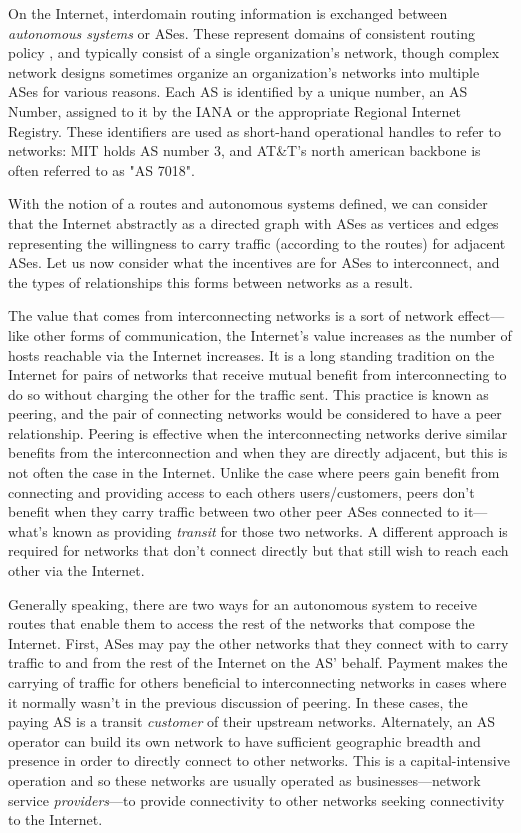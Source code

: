 On the Internet, interdomain routing information is exchanged between \emph{autonomous systems} or ASes. These represent domains of consistent routing policy \cite{rfc1930}, and typically consist of a single organization's network, though complex network designs sometimes organize an organization's networks into multiple ASes for various reasons. Each AS is identified by a unique number, an AS Number, assigned to it by the IANA or the appropriate Regional Internet Registry. These identifiers are used as short-hand operational handles to refer to networks: MIT holds AS number 3, and AT\&T's north american backbone is often referred to as "AS 7018".

With the notion of a routes and autonomous systems defined, we can consider that the Internet abstractly as a directed graph with ASes as vertices and edges representing the willingness to carry traffic (according to the routes) for adjacent ASes. Let us now consider what the incentives are for ASes to interconnect, and the types of relationships this forms between networks as a result.

The value that comes from interconnecting networks is a sort of network effect---like other forms of communication, the Internet's value increases as the number of hosts reachable via the Internet increases. It is a long standing tradition on the Internet for pairs of networks that receive mutual benefit from interconnecting to do so without charging the other for the traffic sent. This practice is known as peering, and the pair of connecting networks would be considered to have a peer relationship. Peering is effective when the interconnecting networks derive similar benefits from the interconnection and when they are directly adjacent, but this is not often the case in the Internet. Unlike the case where peers gain benefit from connecting and providing access to each others users/customers, peers don't benefit when they carry traffic between two other peer ASes connected to it---what's known as providing \emph{transit} for those two networks. A different approach is required for networks that don't connect directly but that still wish to reach each other via the Internet.

Generally speaking, there are two ways for an autonomous system to receive routes that enable them to access the rest of the networks that compose the Internet. First, ASes may pay the other networks that they connect with to carry traffic to and from the rest of the Internet on the AS' behalf. Payment makes the carrying of traffic for others beneficial to interconnecting networks in cases where it normally wasn't in the previous discussion of peering. In these cases, the paying AS is a transit \emph{customer} of their upstream networks. Alternately, an AS operator can build its own network to have sufficient geographic breadth and presence in order to directly connect to other networks. This is a capital-intensive operation and so these networks are usually operated as businesses---network service \emph{providers}---to provide connectivity to other networks seeking connectivity to the Internet.

